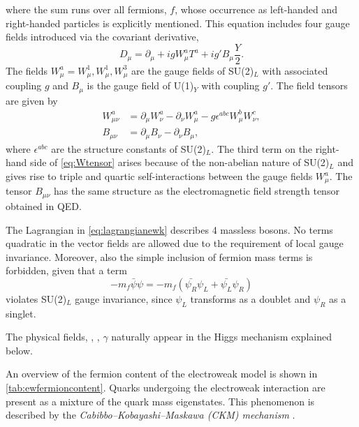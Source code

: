 where the sum runs over all fermions, $f$, whose occurrence as left-handed and right-handed particles is explicitly mentioned.
This equation includes four gauge fields introduced via the covariant derivative,
\begin{equation}
  D_\mu = \partial_\mu + igW_\mu^aT^a + ig'B_\mu \frac{Y}{2}.
  \label{eq:covdevewk}
\end{equation}
The fields $W^a_\mu = W^1_\mu, W^1_\mu, W^3_\mu$ are the gauge fields of SU(2)$_L$ with associated coupling $g$ and $B_\mu$ is the gauge field of U(1)$_Y$ with coupling $g'$.
The field tensors are given by
\begin{align}
  W_{\mu\nu}^a & = \partial_\mu W_\nu^a - \partial_\nu W_\mu^a - g \epsilon^{abc} W^b_\mu W^c_\nu, \label{eq:Wtensor} \\
  B_{\mu\nu}   & = \partial_\mu B_\nu - \partial_\nu B_\mu,
\end{align}
where $\epsilon^{abc}$ are the structure constants of SU(2)$_L$. The third term on the right-hand side of \cref{eq:Wtensor} arises because of the non-abelian nature of SU(2)$_L$ and gives rise to triple and quartic self-interactions between the gauge fields $W_{\mu}^a$.
The tensor $B_{\mu\nu}$ has the same structure as the electromagnetic field strength tensor obtained in QED.

The Lagrangian in \cref{eq:lagrangianewk} describes 4 massless bosons. No terms quadratic in the vector fields are allowed due to the requirement of local gauge invariance. Moreover, also the simple inclusion of fermion mass terms is forbidden, given that a term
\begin{equation}
  -m_f \bar{\psi} \psi = -m_f \left( \bar{\psi_R}\psi_L + \bar{\psi_L}\psi_R \right)
  \label{eq:fermionmassterm}
\end{equation}
violates SU(2)$_L$ gauge invariance, since $\psi_L$ transforms as a doublet and $\psi_R$ as a singlet.

The physical fields, \Wpm, \Zboson, $\gamma$ naturally appear in the Higgs mechanism explained below.



An overview of the fermion content of the electroweak model is shown in \cref{tab:ewfermioncontent}. Quarks undergoing the electroweak interaction are present as a mixture of the quark mass eigenstates. This phenomenon is described by the \emph{Cabibbo–Kobayashi–Maskawa (CKM) mechanism} \cite{doi:10.1143/PTP.49.652}.









